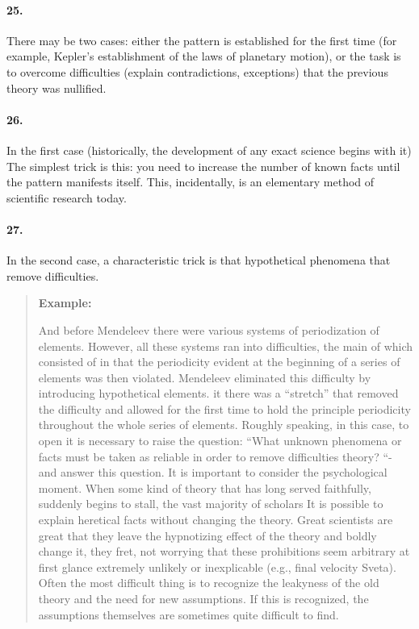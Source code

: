 \documentclass[11pt,a4paper]{article}
\newenvironment{example}{\begin{quote} \textbf{Example:}\par }{\end{quote}}
\begin{document}
\paragraph{25.}
There may be two cases: either the pattern is established for the first time
(for example, Kepler’s establishment of the laws of planetary motion), or the
task is to overcome difficulties (explain contradictions, exceptions) that the
previous theory was nullified.

\paragraph{26.}
In the first case (historically, the development of any exact science begins
with it) The simplest trick is this: you need to increase the number of known
facts until the pattern manifests itself. This, incidentally, is an elementary
method of scientific research today.

\paragraph{27.}
In the second case, a characteristic trick is that hypothetical phenomena that
remove difficulties.

\begin{example}
  And before Mendeleev there were various systems of periodization of
  elements.  However, all these systems ran into difficulties, the main of
  which consisted of in that the periodicity evident at the beginning of a
  series of elements was then violated.  Mendeleev eliminated this difficulty
  by introducing hypothetical elements. it there was a “stretch” that removed
  the difficulty and allowed for the first time to hold the principle
  periodicity throughout the whole series of elements.  Roughly speaking, in
  this case, to open it is necessary to raise the question: “What unknown
  phenomena or facts must be taken as reliable in order to remove difficulties
  theory? “- and answer this question.  It is important to consider the
  psychological moment. When some kind of theory that has long served
  faithfully, suddenly begins to stall, the vast majority of scholars It is
  possible to explain heretical facts without changing the theory. Great
  scientists are great that they leave the hypnotizing effect of the theory
  and boldly change it, they fret, not worrying that these prohibitions seem
  arbitrary at first glance extremely unlikely or inexplicable (e.g., final
  velocity Sveta).  Often the most difficult thing is to recognize the
  leakyness of the old theory and the need for new assumptions. If this is
  recognized, the assumptions themselves are sometimes quite difficult to
  find.
\end{example}
\end{document}
